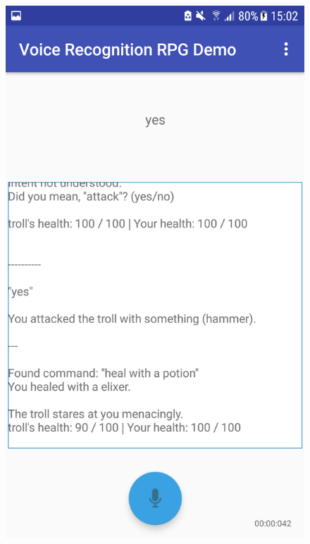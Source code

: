\documentclass[12pt]{article}
\begin{document}
\begin{center}
\begin{figure}[H]
\begin{center}
  \includegraphics[scale=0.25]{Screenshot_20180527-150225.png}
  \label{fig:snapshot-multiple-command-2}
  \end{center}
\end{figure}
\end{center}

\newpage
\end{document}
